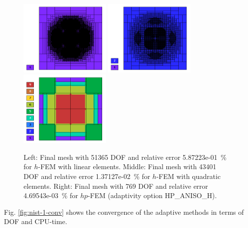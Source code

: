 \documentclass[12pt]{elsarticle}
\begin{document}
\begin{figure}[!ht]
\centering
\includegraphics[height=3.7cm]{nist/nist-1/mesh_h1_aniso.png}
\includegraphics[height=3.7cm]{nist/nist-1/mesh_h2_aniso.png}
\includegraphics[height=3.7cm]{nist/nist-1/mesh_hp_aniso.png}
\vspace{-3mm}
\caption{
Left: Final mesh with 51365 DOF and relative error 5.87223e-01~\% for $h$-FEM with linear elements.
Middle: Final mesh with 43401 DOF and relative error 1.37127e-02~\% for $h$-FEM with quadratic elements. 
Right: Final mesh with 769 DOF and relative error 4.69543e-03~\% for $hp$-FEM (adaptivity option HP\_ANISO\_H).}
\label{fig:nist-1-hp-aniso}
\vspace{-3mm}
\end{figure}

Fig. \ref{fig:nist-1-conv} shows the convergence of the adaptive methods in terms of DOF and CPU-time.
\end{document}
